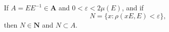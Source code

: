 If $A = EE^{-1} \in \mathbf{A}$ and $0 < \varepsilon < 2\mu(E)$, and if $$N = \{x : \rho(xE, E) < \varepsilon\},$$ then $N \in \mathbf{N}$ and $N \subset A$.